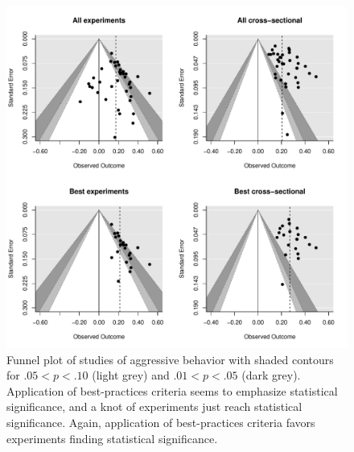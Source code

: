 \documentclass[jou]{apa6}
\begin{document}
\begin{figure}
	\includegraphics[width = \textwidth, keepaspectratio]{funnels-0_AggBeh.pdf}
	\caption{Funnel plot of studies of aggressive behavior with shaded contours for $.05 < p < .10$ (light grey) and $.01 < p < .05$ (dark grey). Application of best-practices criteria seems to emphasize statistical significance, and a knot of experiments just reach statistical significance. Again, application of best-practices criteria favors experiments finding statistical significance.}
	\label{funnel-aggbeh}
\end{figure}
\end{document}
